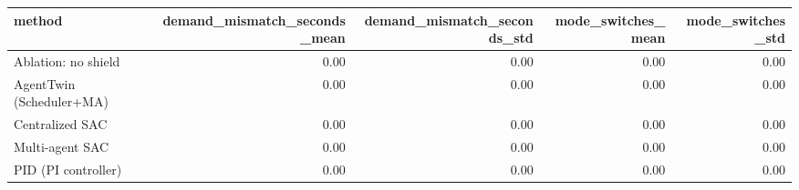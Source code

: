 \begin{tabular}{lrrrr}
\toprule
method & demand_mismatch_seconds_mean & demand_mismatch_seconds_std & mode_switches_mean & mode_switches_std \\
\midrule
Ablation: no shield & 0.00 & 0.00 & 0.00 & 0.00 \\
AgentTwin (Scheduler+MA) & 0.00 & 0.00 & 0.00 & 0.00 \\
Centralized SAC & 0.00 & 0.00 & 0.00 & 0.00 \\
Multi-agent SAC & 0.00 & 0.00 & 0.00 & 0.00 \\
PID (PI controller) & 0.00 & 0.00 & 0.00 & 0.00 \\
\bottomrule
\end{tabular}

